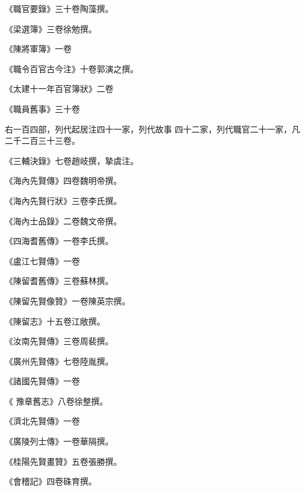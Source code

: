 \begin{pinyinscope}
 《職官要錄》三十卷陶藻撰。



 《梁選簿》三卷徐勉撰。



 《陳將軍簿》一卷



 《職令百官古今注》十卷郭演之撰。



 《太建十一年百官簿狀》二卷



 《職員舊事》三十卷



 右一百四部，列代起居注四十一家，列代故事
 四十二家，列代職官二十一家，凡二千二百三十三卷。



 《三輔決錄》七卷趙岐撰，摯虞注。



 《海內先賢傳》四卷魏明帝撰。



 《海內先賢行狀》三卷李氏撰。



 《海內士品錄》二卷魏文帝撰。



 《四海耆舊傳》一卷李氏撰。



 《盧江七賢傳》一卷



 《陳留耆舊傳》三卷蘇林撰。



 《陳留先賢像贊》一卷陳英宗撰。



 《陳留志》十五卷江敞撰。



 《汝南先賢傳》三卷周裴撰。



 《廣州先賢傳》七卷陸胤撰。



 《諸國先賢傳》一卷



 《
 豫章舊志》八卷徐整撰。



 《濟北先賢傳》一卷



 《廣陵列士傳》一卷華隔撰。



 《桂陽先賢畫贊》五卷張勝撰。



 《會稽記》四卷硃育撰。




\end{pinyinscope}
